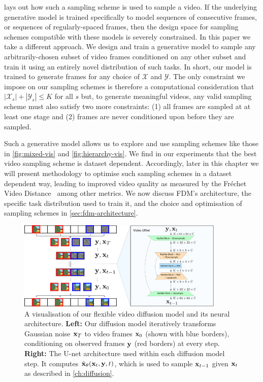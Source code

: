  lays out how such a sampling scheme is used to sample a video. If the underlying generative model is trained specifically to model sequences of consecutive frames, or sequences of regularly-spaced frames, then the design space for sampling schemes compatible with these models is severely constrained. In this paper we take a  different approach.  We design and train a generative model to sample any arbitrarily-chosen subset of video frames conditioned on any other subset and train it using an entirely novel distribution of such tasks. In short, our model is trained to generate frames for any choice of $\mathcal{X}$ and $\mathcal{Y}$. The only constraint we impose on our sampling schemes is therefore a computational consideration that $|\mathcal{X}_s| + |\mathcal{Y}_s| \leq K$ for all $s$ but, to generate meaningful videos, any valid sampling scheme must also satisfy two more constraints: (1) all frames are sampled at at least one stage and (2) frames are never conditioned upon before they are sampled.

Such a generative model allows us to explore and use sampling schemes like those in \cref{fig:mixed-vis} and \cref{fig:hierarchy-vis}.  We find in our experiments that the best video sampling scheme is dataset dependent. Accordingly, later in this chapter we will present methodology to optimise such sampling schemes in a dataset dependent way, leading to improved video quality as measured by the Fréchet Video Distance~\cite{unterthiner2018towards} among other metrics. We now discuss FDM's architecture, the specific task distribution  used to train it, and the choice and optimisation of sampling schemes in \cref{sec:fdm-architecture}.

\begin{figure}[t]
    \centering
    \includegraphics[width=0.88\textwidth]{figs/fdm/video-architecture-v8.pdf}
    \caption{A visualisation of our flexible video diffusion model and its neural architecture. \textbf{Left:} Our diffusion model iteratively transforms Gaussian noise ${\mathbf{x}}_T$ to video frames ${\mathbf{x}}_0$ (shown with blue borders), conditioning on observed frames ${\mathbf{y}}$ (red borders) at every step. \textbf{Right:} The U-net architecture used within each diffusion model step. It computes $\hat{{\mathbf{x}}}_\theta({\mathbf{x}}_t, {\mathbf{y}}, t)$, which is used to sample ${\mathbf{x}}_{t-1}$ given ${\mathbf{x}}_t$ as described in \cref{ch:diffusion}.
    }
    \label{fig:architecture}
\end{figure}

